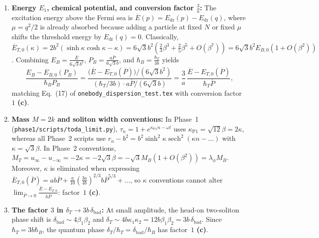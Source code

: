 \documentclass[11pt,a4paper]{article}
\newcommand{\claim}[1]{\textbf{(#1)}}
\begin{document}
\begin{enumerate}
  \item \textbf{Energy $E_1$, chemical potential, and conversion factor $\frac{3}{a}$:}
  The excitation energy above the Fermi sea is $\overline{E}(p) = E_{\mathrm{dr}}(p) - E_{\mathrm{dr}}(q)$,
  where $\mu = q^2/2$ is already absorbed because adding a particle at fixed $N$ or fixed $\mu$ shifts the
  threshold energy by $E_{\mathrm{dr}}(q) = 0$. Classically,
  $\overline{E}_{T,0}(\kappa) = 2b^2(\sinh\kappa\cosh\kappa - \kappa) = 6\sqrt{3}b^2(\frac{2}{3}\beta^3 + \frac{2}{5}\beta^5 + O(\beta^7)) = 6\sqrt{3}b^2 E_{B,0}(1+O(\beta^2))$.
  Combining $E_B = \frac{\overline{E}}{6\sqrt{3}b^2}$, $P_B = \frac{a\overline{P}}{6\sqrt{3}b}$, and $\hbar_B = \frac{\hbar_T}{3b}$ yields
  \begin{equation}
    \frac{E_B - E_{B,0}(P_B)}{\hbar_B P_B}
    = \frac{\bigl(\overline{E} - E_{T,0}(\overline{P})\bigr)/(6\sqrt{3}b^2)}{(\hbar_T/3b)\cdot a\overline{P}/(6\sqrt{3}b)}
    = \frac{3}{a}\,\frac{\overline{E} - E_{T,0}(\overline{P})}{\hbar_T\overline{P}},
    \label{eq:exact-conversion}
  \end{equation}
  matching Eq.~(17) of \texttt{onebody\_dispersion\_test.tex} with conversion factor~$1$ \claim{c}.

  \item \textbf{Mass $M = 2k$ and soliton width conventions:}
  In Phase~1 (\texttt{phase1/scripts/toda\_limit.py}), $\tau_n = 1 + e^{\kappa_{\mathrm{P1}}n - \omega t}$
  uses $\kappa_{\mathrm{P1}} = \sqrt{12}\beta = 2\kappa$, whereas all Phase~2 scripts use
  $r_n - b^2 = b^2\sinh^2\kappa\operatorname{sech}^2(\kappa n - \dots)$ with $\kappa = \sqrt{3}\beta$.
  In Phase~2 conventions, $M_T = u_\infty - u_{-\infty} = -2\kappa = -2\sqrt{3}\beta = -\sqrt{3}M_B(1+O(\beta^2)) = \lambda_\phi M_B$.
  Moreover, $\kappa$ is eliminated when expressing $\overline{E}_{T,0}(\overline{P}) = ab\overline{P} + \frac{a}{10}\left(\frac{3a}{4b}\right)^{2/3}b\overline{P}^{5/3} + \dots$,
  so $\kappa$ conventions cannot alter $\lim_{\overline{P}\to 0}\frac{\overline{E}-E_{T,0}}{h\overline{P}}$: factor~$1$ \claim{c}.

  \item \textbf{The factor $3$ in $\delta_T \to 3b\,\delta_{\mathrm{bad}}$:}
  At small amplitude, the head-on two-soliton phase shift is $\delta_{\mathrm{bad}} \sim 4\beta_1\beta_2$ and
  $\delta_T \sim 4b\kappa_1\kappa_2 = 12b\beta_1\beta_2 = 3b\,\delta_{\mathrm{bad}}$. Since $\hbar_T = 3b\hbar_B$,
  the quantum phase $\delta_T/\hbar_T = \delta_{\mathrm{bad}}/\hbar_B$ has factor~$1$ \claim{c}.
\end{enumerate}
\end{document}
